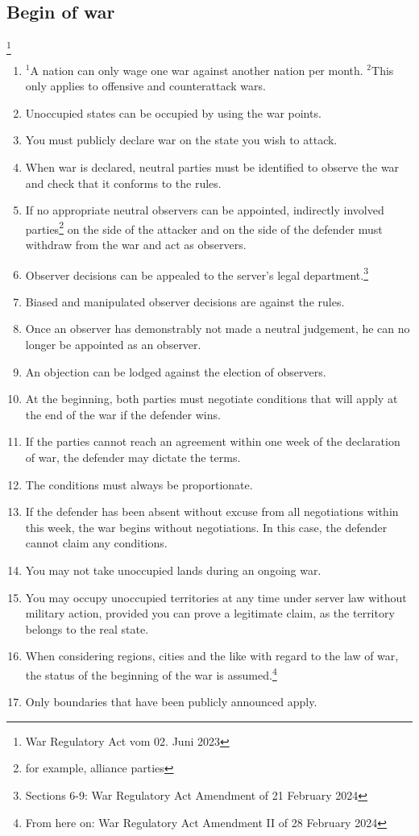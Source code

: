 \documentclass{article}
\newcommand{\sent}[1]{$^{#1}$}
\begin{document}
\subsection{Begin of war}\footnote{War Regulatory Act vom 02. Juni 2023}
\begin{enumerate}[(1)]
	\item \sent{1}A nation can only wage one war against another nation per month. \sent{2}This only applies to offensive and counterattack wars.
	\item Unoccupied states can be occupied by using the war points.
	\item You must publicly declare war on the state you wish to attack. %
	\item When war is declared, neutral parties must be identified to observe the war and check that it conforms to the rules.
	\item If no appropriate neutral observers can be appointed, indirectly involved parties\footnote{for example, alliance parties} on the side of the attacker and on the side of the defender must withdraw from the war and act as observers.
	\item Observer decisions can be appealed to the server's legal department.\footnote{Sections 6-9: War Regulatory Act Amendment of 21 February 2024}
	\item Biased and manipulated observer decisions are against the rules.
	\item Once an observer has demonstrably not made a neutral judgement, he can no longer be appointed as an observer.
	\item An objection can be lodged against the election of observers.
	\item At the beginning, both parties must negotiate conditions that will apply at the end of the war if the defender wins. %
	\item If the parties cannot reach an agreement within one week of the declaration of war, the defender may dictate the terms.
	\item The conditions must always be proportionate.
	\item If the defender has been absent without excuse from all negotiations within this week, the war begins without negotiations. In this case, the defender cannot claim any conditions.
	\item You may not take unoccupied lands during an ongoing war.
	\item You may occupy unoccupied territories at any time under server law without military action, provided you can prove a legitimate claim, as the territory belongs to the real state.
	\item When considering regions, cities and the like with regard to the law of war, the status of the beginning of the war is assumed.\footnote{From here on: War Regulatory Act Amendment II of 28 February 2024}
	\item Only boundaries that have been publicly announced apply.
\end{enumerate}
\end{document}
